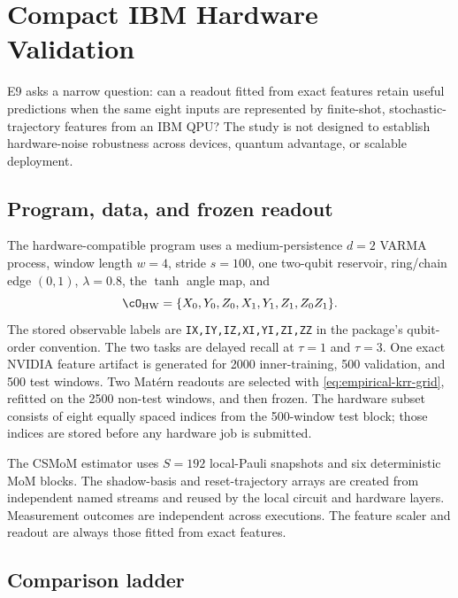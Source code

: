 \section{Compact IBM Hardware Validation}
\label{app:hardware-validation}

E9 asks a narrow question: can a readout fitted from exact features retain useful
predictions when the same eight inputs are represented by finite-shot,
stochastic-trajectory features from an IBM QPU?  The study is not designed to
establish hardware-noise robustness across devices, quantum advantage, or
scalable deployment.

\subsection{Program, data, and frozen readout}
\label{app:hardware-program}

The hardware-compatible program uses a medium-persistence \(d=2\) VARMA process,
window length \(w=4\), stride \(s=100\), one two-qubit reservoir, ring/chain
edge \((0,1)\), \(\lambda=0.8\), the \(\tanh\) angle map, and
\[
 \cO_{\mathrm{HW}}
 =\{X_0,Y_0,Z_0,X_1,Y_1,Z_1,Z_0Z_1\}.
\]
The stored observable labels are
\texttt{IX,IY,IZ,XI,YI,ZI,ZZ} in the package's qubit-order convention.  The two
tasks are delayed recall at \(\tau=1\) and \(\tau=3\).  One exact NVIDIA feature
artifact is generated for 2000 inner-training, 500 validation, and 500 test
windows.  Two Mat\'ern readouts are selected with
\cref{eq:empirical-krr-grid}, refitted on the 2500 non-test windows, and then
frozen.  The hardware subset consists of eight equally spaced indices from the
500-window test block; those indices are stored before any hardware job is
submitted.

The CSMoM estimator uses \(S=192\) local-Pauli snapshots and six deterministic
MoM blocks.  The shadow-basis and reset-trajectory arrays are created from
independent named streams and reused by the local circuit and hardware layers.
Measurement outcomes are independent across executions.  The feature scaler
and readout are always those fitted from exact features.

\subsection{Comparison ladder}
\label{app:hardware-ladder}

